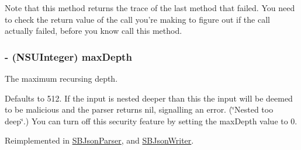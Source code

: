 \-Note that this method returns the trace of the last method that failed. \-You need to check the return value of the call you're making to figure out if the call actually failed, before you know call this method. \hypertarget{interface_s_b_json_base_abe3e47517711570a9a57e2d92a15055b}{
\subsubsection[{max\-Depth}]{\setlength{\rightskip}{0pt plus 5cm}-\/ (\-N\-S\-U\-Integer) max\-Depth}}
\label{interface_s_b_json_base_abe3e47517711570a9a57e2d92a15055b}


\-The maximum recursing depth. 

\-Defaults to 512. \-If the input is nested deeper than this the input will be deemed to be malicious and the parser returns nil, signalling an error. (\char`\"{}\-Nested too deep\char`\"{}.) \-You can turn off this security feature by setting the max\-Depth value to 0. 

\-Reimplemented in \hyperlink{interface_s_b_json_parser_a0378b4ce99a1caeddc4a05da37ca4ffa}{\-S\-B\-Json\-Parser}, and \hyperlink{interface_s_b_json_writer_a283b4f65ab4d3e1a8112b37dea432689}{\-S\-B\-Json\-Writer}.



